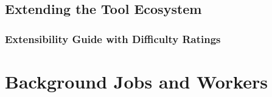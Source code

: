 \documentclass[a4paper,twoside]{sapthesis}
\begin{document}
\section{Extending the Tool Ecosystem}
\label{sec:tool-extension}

\subsection{Extensibility Guide with Difficulty Ratings}
%
%
%
%
%


\chapter{Background Jobs and Workers}
\label{ch:jobs-workers}

\end{document}
